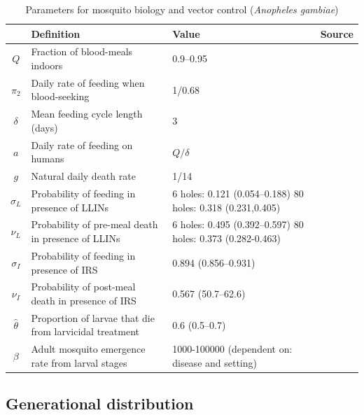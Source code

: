 \begin{table}[t]
\caption[Mosquito parameters and sources.]{Parameters for mosquito biology and vector control (\textit{Anopheles gambiae})}%
\vspace{.1cm}
\centering %
\begin{tabular}{|c|p{54mm}|p{48mm}|c|}%
\hline                        %
 & Definition & Value & Source \\ [0.5ex]%
\hline                  %
$Q$ & Fraction of blood-meals indoors & 0.9--0.95 & \cite{Killeen2000} \\
$\pi_2$ & Daily rate of feeding when blood-seeking & 1/0.68 & \cite{Killeen2000} \\
$\delta$ & Mean feeding cycle length (days) & 3 & \cite{Killeen2000} \\
$a$ & Daily rate of feeding on humans & $Q/\delta$ & \cite{Smith2012}  \\
$g$ & Natural daily death rate & 1/14 & \cite{CDCMalaria,le2007} \\
$\sigma_L$ & Probability of feeding in presence of LLINs & 6 holes: 0.121 (0.054--0.188) 80 holes: 0.318 (0.231,0.405) & \cite{Ngufor2011} \\
$\nu_L$ & Probability of pre-meal death in presence of LLINs & 6 holes: 0.495 (0.392--0.597) 80 holes: 0.373 (0.282-0.463) & \cite{Ngufor2011} \\
$\sigma_I$ & Probability of feeding in presence of IRS & 0.894 (0.856--0.931) & \cite{Ngufor2011} \\
$\nu_I$ & Probability of post-meal death in presence of IRS & 0.567 (50.7--62.6) & \cite{Ngufor2011}\\
$\hat{\theta}$ & Proportion of larvae that die from larvicidal treatment & 0.6 (0.5--0.7) & \cite{Kroeger1995}\\
$\beta$ & Adult mosquito emergence rate from larval stages & 1000-100000 (dependent on: disease and setting) & \\
[1ex]      %
\hline%
\end{tabular}
\label{table:param_vector}%
\end{table}

\subsection{Generational distribution}

